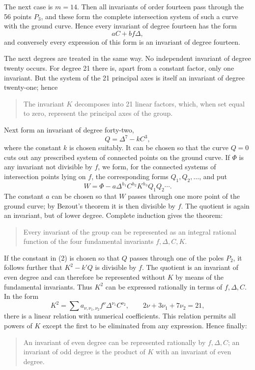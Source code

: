 \documentclass[11pt]{article}
\begin{document}
The next case is \(m=14\). Then all invariants of order fourteen pass through the 56 points \(P_3\), and these form the complete intersection system of such a curve with the ground curve. Hence every invariant of degree fourteen has the form
\begin{equation}
aC+bf\Delta,
\end{equation}
and conversely every expression of this form is an invariant of degree fourteen.

The next degrees are treated in the same way. No independent invariant of degree twenty occurs. For degree 21 there is, apart from a constant factor, only one invariant. But the system of the 21 principal axes is itself an invariant of degree twenty-one; hence
\begin{quote}
The invariant \(K\) decomposes into 21 linear factors, which, when set equal to zero, represent the principal axes of the group.
\end{quote}

Next form an invariant of degree forty-two,
\begin{equation}
Q=\Delta^7-kC^3,
\tag{2}
\end{equation}
where the constant \(k\) is chosen suitably. It can be chosen so that the curve \(Q=0\) cuts out any prescribed system of connected points on the ground curve. If \(\Phi\) is any invariant not divisible by \(f\), we form, for the connected systems of intersection points lying on \(f\), the corresponding forms \(Q_1,Q_2,\ldots\), and put
\begin{equation}
W=\Phi-a\Delta^{h_1}C^{h_2}K^{h_3}Q_1Q_2\cdots.
\end{equation}
The constant \(a\) can be chosen so that \(W\) passes through one more point of the ground curve; by Bezout's theorem it is then divisible by \(f\). The quotient is again an invariant, but of lower degree. Complete induction gives the theorem:
\begin{quote}
Every invariant of the group can be represented as an integral rational function of the four fundamental invariants \(f,\Delta,C,K\).
\end{quote}

If the constant in (2) is chosen so that \(Q\) passes through one of the poles \(P_2\), it follows further that \(K^2-k'Q\) is divisible by \(f\). The quotient is an invariant of even degree and can therefore be represented without \(K\) by means of the fundamental invariants. Thus \(K^2\) can be expressed rationally in terms of \(f,\Delta,C\). In the form
\begin{equation}
K^2=\sum a_{\nu,\nu_1,\nu_2} f^\nu\Delta^{\nu_1}C^{\nu_2},
\qquad
2\nu+3\nu_1+7\nu_2=21,
\tag{3}
\end{equation}
there is a linear relation with numerical coefficients. This relation permits all powers of \(K\) except the first to be eliminated from any expression. Hence finally:
\begin{quote}
An invariant of even degree can be represented rationally by \(f,\Delta,C\); an invariant of odd degree is the product of \(K\) with an invariant of even degree.
\end{quote}

\clearpage
\end{document}
